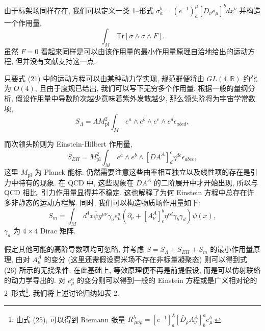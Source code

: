 \documentclass{article}
\begin{document}
由于标架场同样存在, 我们可以定义一类 1--形式 $\sigma_{a}^{b}=(e^{-1})_{a}^{\mu}[D_{\nu}e_{\mu}]^{b}dx^{\nu}$ 并构造一个作用量,
\begin{equation}
\int_{M}\,\textrm{Tr}[\sigma\wedge\sigma\wedge F].
\end{equation}
虽然 $F=0$ 看起来同样是可以由该作用量的最小作用量原理自洽地给出的运动方程, 但并没有文献支持这一点.

只要式 (21) 中的运动方程可以由某种动力学实现, 规范群便将由 $GL(4, \mathbb{R})$ 约化为 $O(4)$, 且由于度规已给出, 我们可以写下无穷多个作用量. 根据一般的量纲分析, 假设作用量中导数阶次越少意味着紫外发散越少, 那么领头阶将为宇宙学常数项,
\begin{equation}
S_{\Lambda}=\Lambda M^{2}_{\textrm{pl}}\int_{M}\,e^{a}\wedge e^{b} \wedge e^{c} \wedge e^{d} \epsilon_{abcd},
\end{equation}

而次领头阶则为 Einstein-Hilbert 作用量,
\begin{equation}
S_{EH}=M^{2}_{\textrm{pl}}\int_{M}\,e^{a}\wedge e^{b} \wedge [\bar{D}A^{A}]_{d}^{c} \eta^{de}\epsilon_{abce},
\end{equation}
这里 $M_{\textrm{pl}}$ 为 Planck 能标. 仍然需要注意这些曲率相互独立以及线性项的存在是引力中特有的现象. 在 QCD 中, 这些现象在 $\bar{D}A^{A}$ 的二阶展开中才开始出现, 所以与 QCD 相比, 引力作用量显得并不稳定. 这也解释了为何 Einstein 方程中总存在许多非静态的运动方程解. 同时, 我们可以构造物质场作用量如下:
\begin{equation}
S_{m}=\int_{M}\,d^{4}x\bar{\psi}g^{\mu\nu}\gamma_{a}e^{a}_{\mu}(\partial_{\nu}+[A_{\nu}^{A}]^{b}_{c}\eta^{cd}\gamma_{b}\gamma_{d})\psi(x),
\end{equation}
$\gamma_{a}$ 为 $4\times 4$ Dirac 矩阵.

假定其他可能的高阶导数项均可忽略, 并考虑 $S=S_{\Lambda}+S_{EH}+S_{m}$ 的最小作用量原理, 由对 $A_{\mu}^{A}$ 的变分 (这里还需假设费米场不存在非标量凝聚态) 则可以得到式 (26) 所示的无挠条件. 在此基础上, 等效原理便不再是前提假设, 而是可以仿射联络的动力学导出的. 对 $e_{\mu}^{a}$ 的变分则可以得到一般的 Einstein 方程或是广义相对论的 2--形式\footnote{由式 (25), 可以得到 Riemann 张量 $R_{\ \mu\nu\rho}^{\lambda}=[e^{-1}]^{\lambda}_{a}[\bar{D}_{\rho}A_{\nu}^{A}]_{b}^{a}e_{\mu}^{b}$.}. 我们将上述讨论归纳如表 2.
\end{document}
